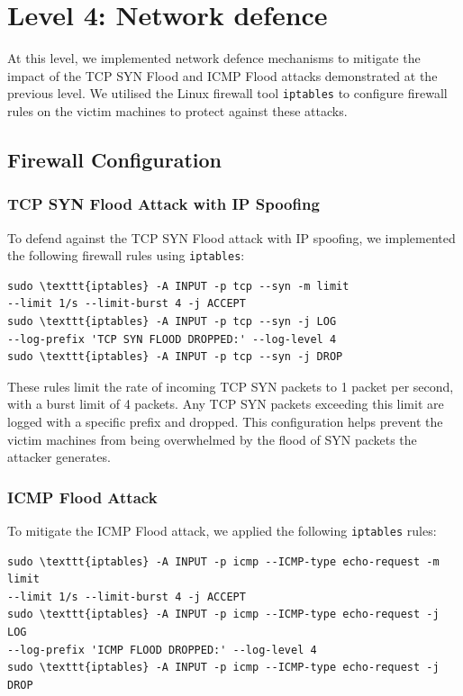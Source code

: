 \chapter{Level 4: Network defence}
At this level, we implemented network defence mechanisms to mitigate the impact of the TCP SYN Flood and ICMP Flood attacks demonstrated at the previous level. We utilised the Linux firewall tool \texttt{iptables} to configure firewall rules on the victim machines to protect against these attacks.

\section{Firewall Configuration}
\subsection{TCP SYN Flood Attack with IP Spoofing}
To defend against the TCP SYN Flood attack with IP spoofing, we implemented the following firewall rules using \texttt{iptables}:

\begin{verbatim}
sudo \texttt{iptables} -A INPUT -p tcp --syn -m limit 
--limit 1/s --limit-burst 4 -j ACCEPT
sudo \texttt{iptables} -A INPUT -p tcp --syn -j LOG 
--log-prefix 'TCP SYN FLOOD DROPPED:' --log-level 4
sudo \texttt{iptables} -A INPUT -p tcp --syn -j DROP
\end{verbatim}

These rules limit the rate of incoming TCP SYN packets to 1 packet per second, with a burst limit of 4 packets. Any TCP SYN packets exceeding this limit are logged with a specific prefix and dropped. This configuration helps prevent the victim machines from being overwhelmed by the flood of SYN packets the attacker generates.

\subsection{ICMP Flood Attack}
To mitigate the ICMP Flood attack, we applied the following \texttt{iptables} rules:

\begin{verbatim}
sudo \texttt{iptables} -A INPUT -p icmp --ICMP-type echo-request -m limit 
--limit 1/s --limit-burst 4 -j ACCEPT
sudo \texttt{iptables} -A INPUT -p icmp --ICMP-type echo-request -j LOG 
--log-prefix 'ICMP FLOOD DROPPED:' --log-level 4
sudo \texttt{iptables} -A INPUT -p icmp --ICMP-type echo-request -j DROP
\end{verbatim}


